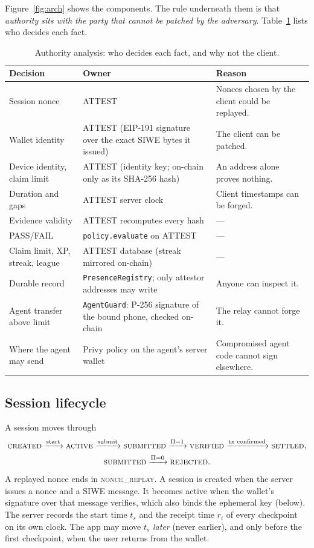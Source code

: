 \documentclass[10pt]{article}
\newcommand{\code}[1]{\texttt{\small #1}}
\begin{document}
Figure~\ref{fig:arch} shows the components. The rule underneath them is that \emph{authority sits with the party that
cannot be patched by the adversary}. Table~\ref{tab:authority} lists who decides each fact.

\begin{table}[h]\small\centering
\caption{Authority analysis: who decides each fact, and why not the client.}\label{tab:authority}
\begin{tabularx}{\linewidth}{@{}l X X@{}}\toprule
\textbf{Decision} & \textbf{Owner} & \textbf{Reason}\\\midrule
Session nonce & ATTEST & Nonces chosen by the client could be replayed. \\
Wallet identity & ATTEST (EIP-191 signature over the exact SIWE bytes it issued) & The client can be patched. \\
Device identity, claim limit & ATTEST (identity key; on-chain only as its SHA-256 hash) & An address alone proves nothing. \\
Duration and gaps & ATTEST server clock & Client timestamps can be forged. \\
Evidence validity & ATTEST recomputes every hash & --- \\
PASS/FAIL & \code{policy.evaluate} on ATTEST & --- \\
Claim limit, XP, streak, league & ATTEST database (streak mirrored on-chain) & --- \\
Durable record & \code{PresenceRegistry}; only attestor addresses may write & Anyone can inspect it. \\
Agent transfer above limit & \code{AgentGuard}: P-256 signature of the bound phone, checked on-chain & The relay cannot forge it. \\
Where the agent may send & Privy policy on the agent's server wallet & Compromised agent code cannot sign elsewhere. \\\bottomrule
\end{tabularx}
\end{table}

\subsection{Session lifecycle}
A session moves through
\[
\begin{gathered}
\textsc{created}\xrightarrow{\text{start}}\textsc{active}\xrightarrow{\text{submit}}\textsc{submitted}
\xrightarrow{\Pi=1}\textsc{verified}\xrightarrow{\text{tx confirmed}}\textsc{settled},\\
\textsc{submitted}\xrightarrow{\Pi=0}\textsc{rejected}.
\end{gathered}
\]
A replayed nonce ends in \textsc{nonce\_replay}. A session is created when the server issues a nonce and a SIWE message.
It becomes active when the wallet's signature over that message verifies, which also binds the ephemeral key (below). The
server records the start time $t_s$ and the receipt time $r_i$ of every checkpoint on its own clock. The app may move
$t_s$ \emph{later} (never earlier), and only before the first checkpoint, when the user returns from the wallet.
\end{document}

